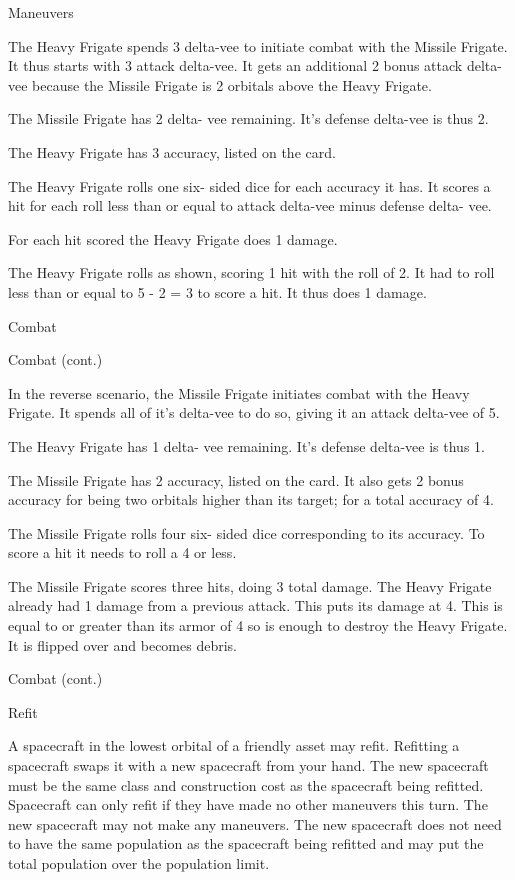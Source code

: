 \documentclass[twoside]{minimal}
\newenvironment{section}[1]
{\renewcommand{\title}{\begin{center} \fontsize{24.88}{32}\selectfont #1 \end{center}} \ignorespaces}
{\clearpage \ignorespacesafterend}
\newenvironment{supersection}[1]
{
\renewcommand{\title}{\begin{center} \fontsize{24.88}{32}\selectfont #1 \end{center}}
\renewenvironment{section}[1]
 {\title \renewcommand{\title}{\begin{flushleft} \fontsize{20.74}{28}\selectfont ##1 \end{flushleft}} \ignorespaces}
 {\clearpage \ignorespacesafterend}
\ignorespaces
}
{\clearpage \ignorespacesafterend}
\begin{document}
\begin{supersection}{Maneuvers}
\begin{section}{Combat}
        The Heavy Frigate spends 3 delta-vee to initiate combat with the Missile Frigate.
        It thus starts with 3 attack delta-vee.
        It gets an additional 2 bonus attack delta-vee because the Missile Frigate is 2 orbitals above the Heavy Frigate.

        The Missile Frigate has 2 delta- vee remaining.
        It’s defense delta-vee is thus 2.

        The Heavy Frigate has 3 accuracy, listed on the card.

        The Heavy Frigate rolls one six- sided dice for each accuracy it has.
        It scores a hit for each roll less than or equal to attack delta-vee minus defense delta- vee.

        For each hit scored the Heavy Frigate does 1 damage.

        The Heavy Frigate rolls as shown, scoring 1 hit with the roll of 2.
        It had to roll less than or equal to 5 - 2 = 3 to score a hit.
        It thus does 1 damage.
    \end{section}

    \begin{section}{Combat (cont.)}
        \title

        In the reverse scenario, the Missile Frigate initiates combat with the Heavy Frigate.
        It spends all of it’s delta-vee to do so, giving it an attack delta-vee of 5.

        The Heavy Frigate has 1 delta- vee remaining.
        It’s defense delta-vee is thus 1.

        The Missile Frigate has 2 accuracy, listed on the card.
        It also gets 2 bonus accuracy for being two orbitals higher than its target; for a total accuracy of 4.

        The Missile Frigate rolls four six- sided dice corresponding to its accuracy.
        To score a hit it needs to roll a 4 or less.

        The Missile Frigate scores three hits, doing 3 total damage.
        The Heavy Frigate already had 1 damage from a previous attack.
        This puts its damage at 4.
        This is equal to or greater than its armor of 4 so is enough to destroy the Heavy Frigate.
        It is flipped over and becomes debris.
    \end{section}

    \begin{section}{Refit}
        \title

        A spacecraft in the lowest orbital of a friendly asset may refit.
        Refitting a spacecraft swaps it with a new spacecraft from your hand.
        The new spacecraft must be the same class and construction cost as the spacecraft being refitted.
        Spacecraft can only refit if they have made no other maneuvers this turn.
        The new spacecraft may not make any maneuvers.
        The new spacecraft does not need to have the same population as the spacecraft being refitted and may put the total population over the population limit.


\end{section}
\end{supersection}
\end{document}
